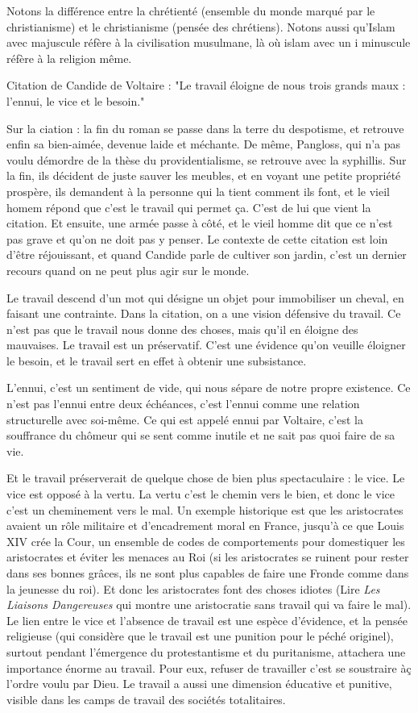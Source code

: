 \documentclass[a4paper,12pt]{book}
\begin{document}
\par Notons la différence entre la chrétienté (ensemble du monde marqué par le christianisme) et le christianisme (pensée des chrétiens). Notons aussi qu'Islam avec majuscule réfère à la civilisation musulmane, là où islam avec un i minuscule réfère à la religion même. 
\par Citation de Candide de Voltaire : "Le travail éloigne de nous trois grands maux : l'ennui, le vice et le besoin."
\par Sur la ciation : la fin du roman se passe dans la terre du despotisme, et retrouve enfin sa bien-aimée, devenue laide et méchante. De même, Pangloss, qui n'a pas voulu démordre de la thèse du providentialisme, se retrouve avec la syphillis. Sur la fin, ils décident de juste sauver les meubles, et en voyant une petite propriété prospère, ils demandent à la personne qui la tient comment ils font, et le vieil homem répond que c'est le travail qui permet ça. C'est de lui que vient la citation. Et ensuite, une armée passe à côté, et le vieil homme dit que ce n'est pas grave et qu'on ne doit pas y penser. Le contexte de cette citation est loin d'être réjouissant, et quand Candide parle de cultiver son jardin, c'est un dernier recours quand on ne peut plus agir sur le monde.
\par Le travail descend d'un mot qui désigne un objet pour immobiliser un cheval, en faisant une contrainte. Dans la citation, on a une vision défensive du travail. Ce n'est pas que le travail nous donne des choses, mais qu'il en éloigne des mauvaises. Le travail est un préservatif. C'est une évidence qu'on veuille éloigner le besoin, et le travail sert en effet à obtenir une subsistance. 
\par L'ennui, c'est un sentiment de vide, qui nous sépare de notre propre existence. Ce n'est pas l'ennui entre deux échéances, c'est l'ennui comme une relation structurelle avec soi-même. Ce qui est appelé ennui par Voltaire, c'est la souffrance du chômeur qui se sent comme inutile et ne sait pas quoi faire de sa vie.
\par Et le travail préserverait de quelque chose de bien plus spectaculaire : le vice. Le vice est opposé à la vertu. La vertu c'est le chemin vers le bien, et donc le vice c'est un cheminement vers le mal. Un exemple historique est que les aristocrates avaient un rôle militaire et d'encadrement moral en France, jusqu'à ce que Louis XIV crée la Cour, un ensemble de codes de comportements pour domestiquer les aristocrates et éviter les menaces au Roi (si les aristocrates se ruinent pour rester dans ses bonnes grâces, ils ne sont plus capables de faire une Fronde comme dans la jeunesse du roi). Et donc les aristocrates font des choses idiotes (Lire \textit{Les Liaisons Dangereuses} qui montre une aristocratie sans travail qui va faire le mal). Le lien entre le vice et l'absence de travail est une espèce d'évidence, et la pensée religieuse (qui considère que le travail est une punition pour le péché originel), surtout pendant l'émergence du protestantisme et du puritanisme, attachera une importance énorme au travail. Pour eux, refuser de travailler c'est se soustraire àç l'ordre voulu par Dieu. Le travail a aussi une dimension éducative et punitive, visible dans les camps de travail des sociétés totalitaires. 
\end{document}
